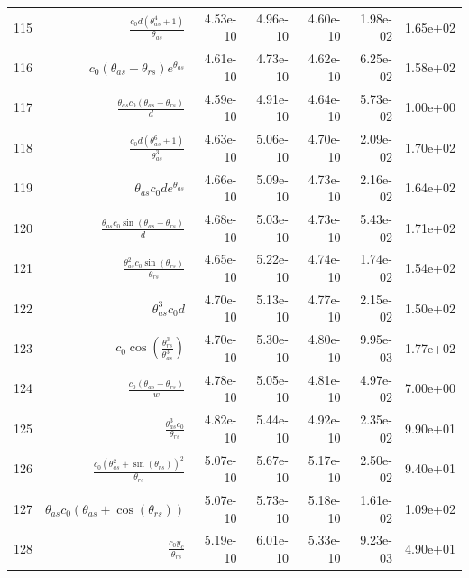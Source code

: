 \begin{tabularx}{\textwidth}{lRRRRRl}
115  &  $ \displaystyle\frac{c_{0} d \left(\theta_{as}^{4} + 1\right)}{\theta_{as}} $  &  4.53e-10  &  4.96e-10  &  4.60e-10  &  1.98e-02  &  1.65e+02  \\ 
116  &  $ c_{0} \left(\theta_{as} - \theta_{rs}\right) e^{\theta_{as}} $  &  4.61e-10  &  4.73e-10  &  4.62e-10  &  6.25e-02  &  1.58e+02  \\ 
117  &  $ \displaystyle\frac{\theta_{as} c_{0} \left(\theta_{as} - \theta_{rs}\right)}{d} $  &  4.59e-10  &  4.91e-10  &  4.64e-10  &  5.73e-02  &  1.00e+00  \\ 
118  &  $ \displaystyle\frac{c_{0} d \left(\theta_{as}^{6} + 1\right)}{\theta_{as}^{3}} $  &  4.63e-10  &  5.06e-10  &  4.70e-10  &  2.09e-02  &  1.70e+02  \\ 
119  &  $ \theta_{as} c_{0} d e^{\theta_{as}} $  &  4.66e-10  &  5.09e-10  &  4.73e-10  &  2.16e-02  &  1.64e+02  \\ 
120  &  $ \displaystyle\frac{\theta_{as} c_{0} \sin{\left(\theta_{as} - \theta_{rs} \right)}}{d} $  &  4.68e-10  &  5.03e-10  &  4.73e-10  &  5.43e-02  &  1.71e+02  \\ 
121  &  $ \displaystyle\frac{\theta_{as}^{2} c_{0} \sin{\left(\theta_{rs} \right)}}{\theta_{rs}} $  &  4.65e-10  &  5.22e-10  &  4.74e-10  &  1.74e-02  &  1.54e+02  \\ 
122  &  $ \theta_{as}^{3} c_{0} d $  &  4.70e-10  &  5.13e-10  &  4.77e-10  &  2.15e-02  &  1.50e+02  \\ 
123  &  $ c_{0} \cos{\left(\displaystyle\frac{\theta_{rs}^{3}}{\theta_{as}^{3}} \right)} $  &  4.70e-10  &  5.30e-10  &  4.80e-10  &  9.95e-03  &  1.77e+02  \\ 
124  &  $ \displaystyle\frac{c_{0} \left(\theta_{as} - \theta_{rs}\right)}{w} $  &  4.78e-10  &  5.05e-10  &  4.81e-10  &  4.97e-02  &  7.00e+00  \\ 
125  &  $ \displaystyle\frac{\theta_{as}^{3} c_{0}}{\theta_{rs}} $  &  4.82e-10  &  5.44e-10  &  4.92e-10  &  2.35e-02  &  9.90e+01  \\ 
126  &  $ \displaystyle\frac{c_{0} \left(\theta_{as}^{2} + \sin{\left(\theta_{rs} \right)}\right)^{2}}{\theta_{rs}} $  &  5.07e-10  &  5.67e-10  &  5.17e-10  &  2.50e-02  &  9.40e+01  \\ 
127  &  $ \theta_{as} c_{0} \left(\theta_{as} + \cos{\left(\theta_{rs} \right)}\right) $  &  5.07e-10  &  5.73e-10  &  5.18e-10  &  1.61e-02  &  1.09e+02  \\ 
128  &  $ \displaystyle\frac{c_{0} y_c}{\theta_{rs}} $  &  5.19e-10  &  6.01e-10  &  5.33e-10  &  9.23e-03  &  4.90e+01  \\ 

\end{tabularx}
